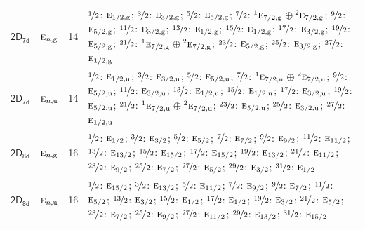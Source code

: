 \documentclass[10pt,a4paper]{article}
\numberwithin{equation}{section}
\newcommand{\grp}[1]{\mathsf{#1}}
\newcommand{\irr}[1]{\text{\normalfont\scshape #1}}
\newcommand{\conjpair}[1]{{}^{#1}}
\newcommand{\ptag}[1]{\mathrm{#1}}
\newlength{\fillwidth}\newlength{\cellwidth}\newlength{\colwidth}
\begin{document}
{\begin{longtable}{@{}llr>{\RaggedRight\arraybackslash}p{\fillwidth}@{}}
\href{2D7d.pdf}{$\grp{2D_{7d}}$} & $\irr{e}_{n,\ptag{g}}$ & 14 & $\nicefrac{1}{2}$: $\irr{e}_{1/2,\ptag{g}}$; $\nicefrac{3}{2}$: $\irr{e}_{3/2,\ptag{g}}$; $\nicefrac{5}{2}$: $\irr{e}_{5/2,\ptag{g}}$; $\nicefrac{7}{2}$: $\conjpair{1}\irr{e}_{7/2,\ptag{g}}$${}\oplus{}$$\conjpair{2}\irr{e}_{7/2,\ptag{g}}$; $\nicefrac{9}{2}$: $\irr{e}_{5/2,\ptag{g}}$; $\nicefrac{11}{2}$: $\irr{e}_{3/2,\ptag{g}}$; $\nicefrac{13}{2}$: $\irr{e}_{1/2,\ptag{g}}$; $\nicefrac{15}{2}$: $\irr{e}_{1/2,\ptag{g}}$; $\nicefrac{17}{2}$: $\irr{e}_{3/2,\ptag{g}}$; $\nicefrac{19}{2}$: $\irr{e}_{5/2,\ptag{g}}$; $\nicefrac{21}{2}$: $\conjpair{1}\irr{e}_{7/2,\ptag{g}}$${}\oplus{}$$\conjpair{2}\irr{e}_{7/2,\ptag{g}}$; $\nicefrac{23}{2}$: $\irr{e}_{5/2,\ptag{g}}$; $\nicefrac{25}{2}$: $\irr{e}_{3/2,\ptag{g}}$; $\nicefrac{27}{2}$: $\irr{e}_{1/2,\ptag{g}}$\\
\href{2D7d.pdf}{$\grp{2D_{7d}}$} & $\irr{e}_{n,\ptag{u}}$ & 14 & $\nicefrac{1}{2}$: $\irr{e}_{1/2,\ptag{u}}$; $\nicefrac{3}{2}$: $\irr{e}_{3/2,\ptag{u}}$; $\nicefrac{5}{2}$: $\irr{e}_{5/2,\ptag{u}}$; $\nicefrac{7}{2}$: $\conjpair{1}\irr{e}_{7/2,\ptag{u}}$${}\oplus{}$$\conjpair{2}\irr{e}_{7/2,\ptag{u}}$; $\nicefrac{9}{2}$: $\irr{e}_{5/2,\ptag{u}}$; $\nicefrac{11}{2}$: $\irr{e}_{3/2,\ptag{u}}$; $\nicefrac{13}{2}$: $\irr{e}_{1/2,\ptag{u}}$; $\nicefrac{15}{2}$: $\irr{e}_{1/2,\ptag{u}}$; $\nicefrac{17}{2}$: $\irr{e}_{3/2,\ptag{u}}$; $\nicefrac{19}{2}$: $\irr{e}_{5/2,\ptag{u}}$; $\nicefrac{21}{2}$: $\conjpair{1}\irr{e}_{7/2,\ptag{u}}$${}\oplus{}$$\conjpair{2}\irr{e}_{7/2,\ptag{u}}$; $\nicefrac{23}{2}$: $\irr{e}_{5/2,\ptag{u}}$; $\nicefrac{25}{2}$: $\irr{e}_{3/2,\ptag{u}}$; $\nicefrac{27}{2}$: $\irr{e}_{1/2,\ptag{u}}$\\
\href{2D8d.pdf}{$\grp{2D_{8d}}$} & $\irr{e}_{n,\ptag{g}}$ & 16 & $\nicefrac{1}{2}$: $\irr{e}_{1/2}$; $\nicefrac{3}{2}$: $\irr{e}_{3/2}$; $\nicefrac{5}{2}$: $\irr{e}_{5/2}$; $\nicefrac{7}{2}$: $\irr{e}_{7/2}$; $\nicefrac{9}{2}$: $\irr{e}_{9/2}$; $\nicefrac{11}{2}$: $\irr{e}_{11/2}$; $\nicefrac{13}{2}$: $\irr{e}_{13/2}$; $\nicefrac{15}{2}$: $\irr{e}_{15/2}$; $\nicefrac{17}{2}$: $\irr{e}_{15/2}$; $\nicefrac{19}{2}$: $\irr{e}_{13/2}$; $\nicefrac{21}{2}$: $\irr{e}_{11/2}$; $\nicefrac{23}{2}$: $\irr{e}_{9/2}$; $\nicefrac{25}{2}$: $\irr{e}_{7/2}$; $\nicefrac{27}{2}$: $\irr{e}_{5/2}$; $\nicefrac{29}{2}$: $\irr{e}_{3/2}$; $\nicefrac{31}{2}$: $\irr{e}_{1/2}$\\
\href{2D8d.pdf}{$\grp{2D_{8d}}$} & $\irr{e}_{n,\ptag{u}}$ & 16 & $\nicefrac{1}{2}$: $\irr{e}_{15/2}$; $\nicefrac{3}{2}$: $\irr{e}_{13/2}$; $\nicefrac{5}{2}$: $\irr{e}_{11/2}$; $\nicefrac{7}{2}$: $\irr{e}_{9/2}$; $\nicefrac{9}{2}$: $\irr{e}_{7/2}$; $\nicefrac{11}{2}$: $\irr{e}_{5/2}$; $\nicefrac{13}{2}$: $\irr{e}_{3/2}$; $\nicefrac{15}{2}$: $\irr{e}_{1/2}$; $\nicefrac{17}{2}$: $\irr{e}_{1/2}$; $\nicefrac{19}{2}$: $\irr{e}_{3/2}$; $\nicefrac{21}{2}$: $\irr{e}_{5/2}$; $\nicefrac{23}{2}$: $\irr{e}_{7/2}$; $\nicefrac{25}{2}$: $\irr{e}_{9/2}$; $\nicefrac{27}{2}$: $\irr{e}_{11/2}$; $\nicefrac{29}{2}$: $\irr{e}_{13/2}$; $\nicefrac{31}{2}$: $\irr{e}_{15/2}$\\

\end{longtable}}
\end{document}
